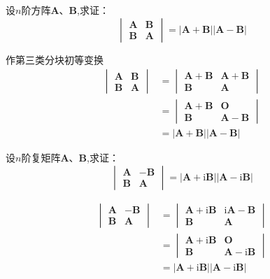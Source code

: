 \begin{brown}
\begin{example}
    设$n$阶方阵$\bm{A}$、$\bm{B}$,求证：
    \[
    \begin{vmatrix}
        \bm{A}&\bm{B}\\
        \bm{B}&\bm{A}
    \end{vmatrix}
    =
    \left|\bm{A}+\bm{B}\right|
    \left|\bm{A}-\bm{B}\right|
    \]
    \begin{solution}
        作第三类分块初等变换
        \begin{align*}
            \begin{vmatrix}
        \bm{A}&\bm{B}\\
        \bm{B}&\bm{A}
    \end{vmatrix}
    &=
    \begin{vmatrix}
        \bm{A}+\bm{B}&\bm{A}+\bm{B}\\
        \bm{B}&\bm{A}
    \end{vmatrix}\\
    &=\begin{vmatrix}
        \bm{A}+\bm{B}&\bm{O}\\
        \bm{B}&\bm{A}-\bm{B}
    \end{vmatrix}\\
    &=
    \left|\bm{A}+\bm{B}\right|
    \left|\bm{A}-\bm{B}\right|
        \end{align*}
    \end{solution}
\end{example}
\end{brown}
\begin{brown}
\begin{example}\label{ex:1}
    设$n$阶复矩阵$\bm{A}$、$\bm{B}$,求证：
    \[
    \begin{vmatrix}
        \bm{A}&-\bm{B}\\
        \bm{B}&\bm{A}
    \end{vmatrix}=\left|
        \bm{A}+\mathrm{i}\bm{B}
    \right|\left|\bm{A}-\mathrm{i}\bm{B}\right|
    \]
    \begin{solution}
    \begin{align*}
            \begin{vmatrix}
        \bm{A}&-\bm{B}\\
        \bm{B}&\bm{A}
    \end{vmatrix}
    &=
    \begin{vmatrix}
        \bm{A}+\mathrm{i}\bm{B}&\mathrm{i}\bm{A}-\bm{B}\\
        \bm{B}&\bm{A}
    \end{vmatrix}\\
    &=\begin{vmatrix}
        \bm{A}+\mathrm{i}\bm{B}&\bm{O}\\
        \bm{B}&\bm{A}-\mathrm{i}\bm{B}
    \end{vmatrix}\\
    &=
    \left|\bm{A}+\mathrm{i}\bm{B}\right|
    \left|\bm{A}-\mathrm{i}\bm{B}\right|
        \end{align*}
    \end{solution}
\end{example}
\end{brown}
